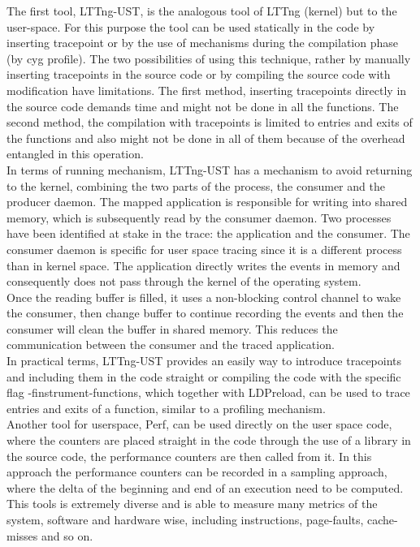 The first tool, LTTng-UST, is the analogous tool of LTTng (kernel) but to the user-space. For this purpose the tool can be used statically in the code by inserting tracepoint or by the use of mechanisms during the compilation phase (by cyg profile). The two possibilities of using this technique, rather by manually inserting tracepoints in the source code or by compiling the source code with modification have limitations. The first method, inserting tracepoints directly in the source code demands time and might not be done in all the functions. The second method, the compilation with tracepoints is limited to entries and exits of the functions and also might not be done in all of them because of the overhead entangled in this operation.\\
In terms of running mechanism, LTTng-UST has a mechanism to avoid returning to the kernel, combining the two parts of the process, the consumer and the producer daemon. The mapped application is responsible for writing into shared memory, which is subsequently read by the consumer daemon. Two processes have been identified at stake in the trace: the application and the consumer. The consumer daemon is specific for user space tracing since it is a different process than in kernel space. The application directly writes the events in memory and consequently does not pass through the kernel of the operating system. \\
Once the reading buffer is filled, it uses a non-blocking control channel to wake the consumer, then change buffer to continue recording the events and then the consumer will clean the buffer in shared memory. This reduces the communication between the consumer and the traced application.\\
In practical terms, LTTng-UST provides an easily way to introduce tracepoints and including them in the code straight or compiling the code with the specific flag -finstrument-functions, which together with LDPreload, can be used to trace entries and exits of a function, similar to a profiling mechanism.\\
Another tool for userspace, Perf, can be used directly on the user space code, where the counters are placed straight in the code through the use of a library in the source code, the performance counters are then called from it. In this approach the performance counters can be recorded in a sampling approach, where the delta of the beginning and end of an execution need to be computed. This tools is extremely diverse and is able to measure many metrics of the system, software and hardware wise, including instructions, page-faults, cache-misses and so on.\\
